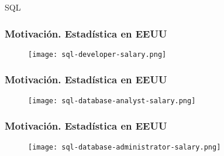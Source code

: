 \begin{frame}
    \centering
    \Huge \textcolor{blue3}{SQL}

\end{frame}

\begin{frame}
	
	\frametitle{Motivación. Estadística en EEUU}
	
	\begin{figure}[h]
		\centering
		\texttt{[image: sql-developer-salary.png]}
	\end{figure}
	
\end{frame}


\begin{frame}
	
	\frametitle{Motivación. Estadística en EEUU}
	
	\begin{figure}[h]
		\centering
		\texttt{[image: sql-database-analyst-salary.png]}
	\end{figure}
	
\end{frame}


\begin{frame}
	
	\frametitle{Motivación. Estadística en EEUU}
	
	\begin{figure}[h]
		\centering
		\texttt{[image: sql-database-administrator-salary.png]}
	\end{figure}
	
\end{frame}


